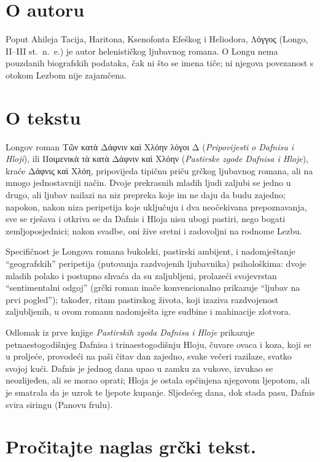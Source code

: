 \section*{O autoru}

Poput Ahileja Tacija, Haritona, Ksenofonta Efeškog i Heliodora, Λόγγος (Longo, II–III st.\ n.~e.) je autor helenističkog ljubavnog romana. O Longu nema pouzdanih biografskih podataka, čak ni što se imena tiče; ni njegova povezanost s otokom Lezbom nije zajamčena.

\section*{O tekstu}

Longov roman Τῶν κατὰ Δάφνιν καὶ Χλόην λόγοι Δ (\textit{Pripovijesti o Dafnisu i Hloji}), ili Ποιμενικὰ τὰ κατὰ Δάφνιν καὶ Χλόην (\textit{Pastirske zgode Dafnisa i Hloje}), kraće Δάφνις καὶ Χλόη, pripovijeda tipičnu priču grčkog ljubavnog romana, ali na mnogo jednostavniji način. Dvoje prekrasnih mladih ljudi zaljubi se jedno u drugo, ali ljubav nailazi na niz prepreka koje im ne daju da budu zajedno; napokon, nakon niza peripetija koje uključuju i dva neočekivana prepoznavanja, sve se rješava i otkriva se da Dafnis i Hloja nisu ubogi pastiri, nego bogati zemljoposjednici; nakon svadbe, oni žive sretni i zadovoljni na rodnome Lezbu.

Specifičnost je Longova romana bukolski, pastirski ambijent, i nadomještanje ``geografskih'' peripetija (putovanja razdvojenih ljubavnika) psihološkima: dvoje mladih polako i postupno shvaća da su zaljubljeni, prolazeći svojevrstan ``sentimentalni odgoj'' (grčki roman inače konvencionalno prikazuje ``ljubav na prvi pogled''); također, ritam pastirskog života, koji izaziva razdvojenost zaljubljenih, u ovom romanu nadomješta igre sudbine i mahinacije zlotvora.

Odlomak iz prve knjige \textit{Pastirskih zgoda Dafnisa i Hloje} prikazuje petnaestogodišnjeg Dafnisa i trinaestogodišnju Hloju, čuvare ovaca i koza, koji se u proljeće, provodeći na paši čitav dan zajedno, svake večeri razilaze, svatko svojoj kući. Dafnis je jednog dana upao u zamku za vukove, izvukao se neozlijeđen, ali se morao oprati; Hloja je ostala opčinjena njegovom ljepotom, ali je smatrala da je uzrok te ljepote kupanje. Sljedećeg dana, dok stada pasu, Dafnis svira siringu (Panovu frulu).


\section*{Pročitajte naglas grčki tekst.}

